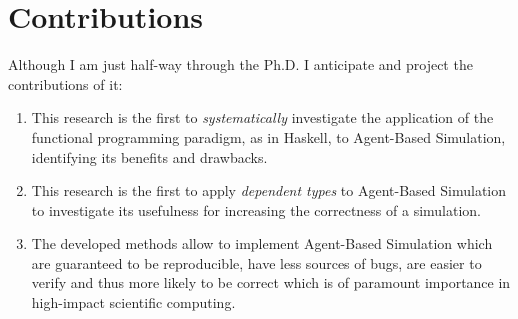 \section{Contributions}
\label{sect:contrib}
Although I am just half-way through the Ph.D. I anticipate and project the contributions of it:

\begin{enumerate}
	\item This research is the first to \textit{systematically} investigate the application of the functional programming paradigm, as in Haskell, to Agent-Based Simulation, identifying its benefits and drawbacks.
	\item This research is the first to apply \textit{dependent types} to Agent-Based Simulation to investigate its usefulness for increasing the correctness of a simulation.
	\item The developed methods allow to implement Agent-Based Simulation which are guaranteed to be reproducible, have less sources of bugs, are easier to verify and thus more likely to be correct which is of paramount importance in high-impact scientific computing. 
\end{enumerate}